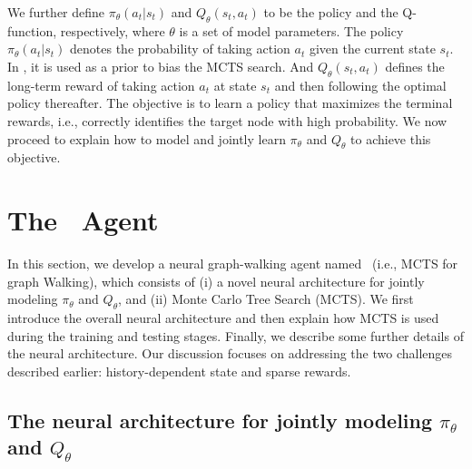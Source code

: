 \documentclass{article}
\begin{document}
    We further define $\pi_{\theta}(a_t|s_t)$ and $Q_{\theta}(s_t, a_t)$ to be the policy and the Q-function, respectively, where $\theta$ is a set of model parameters. The policy $\pi_{\theta}(a_t|s_t)$ denotes the probability of taking action $a_t$ given the current state $s_t$. In \modelname, it is used as a prior to bias the MCTS search. And $Q_{\theta}(s_t,a_t)$ defines the long-term reward of taking action $a_t$ at state $s_t$ and then following the optimal policy thereafter. The objective is to learn a policy that maximizes the terminal rewards, i.e., correctly identifies the target node with high probability. We now proceed to explain how to model and jointly learn $\pi_{\theta}$ and $Q_{\theta}$ to achieve this objective.


	
	\section{The \modelname~Agent}
	\label{Sec:\modelname}
	
	In this section, we develop a neural graph-walking agent named \modelname~(i.e., MCTS for graph Walking), which consists of (i) a novel neural architecture for jointly modeling $\pi_{\theta}$ and $Q_{\theta}$, and (ii) Monte Carlo Tree Search (MCTS). We first introduce the overall neural architecture and then explain how MCTS is used during the training and testing stages. Finally, we describe some further details of the neural architecture. Our discussion focuses on addressing the two challenges described earlier: history-dependent state and sparse rewards.
	
	\subsection{The neural architecture for jointly modeling $\pi_{\theta}$ and $Q_{\theta}$}
	\label{Sec:\modelname:Model}
	
\end{document}
